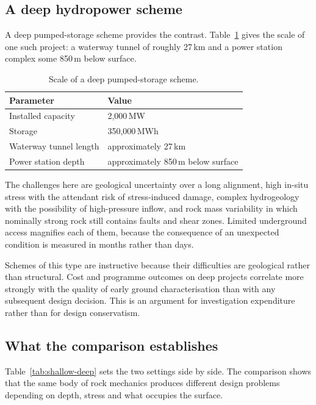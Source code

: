 \subsection{A deep hydropower scheme}
\label{sec:case-deep}

A deep pumped-storage scheme provides the contrast. Table~\ref{tab:deep-case}
gives the scale of one such project: a waterway tunnel of roughly 27\,km and a
power station complex some 850\,m below surface.

\begin{table}[htbp]
\caption{Scale of a deep pumped-storage scheme.}
\label{tab:deep-case}
\centering
\small
\begin{tabularx}{\textwidth}{X l}
\toprule
\textbf{Parameter} & \textbf{Value} \\
\midrule
Installed capacity & 2{,}000\,MW \\
Storage & 350{,}000\,MWh \\
Waterway tunnel length & approximately 27\,km \\
Power station depth & approximately 850\,m below surface \\
\bottomrule
\end{tabularx}
\end{table}

The challenges here are geological uncertainty over a long alignment, high
in-situ stress with the attendant risk of stress-induced damage, complex
hydrogeology with the possibility of high-pressure inflow, and rock mass
variability in which nominally strong rock still contains faults and shear
zones. Limited underground access magnifies each of them, because the
consequence of an unexpected condition is measured in months rather than days.

Schemes of this type are instructive because their difficulties are
geological rather than structural. Cost and programme outcomes on deep
projects correlate more strongly with the quality of early ground
characterisation than with any subsequent design decision. This is an
argument for investigation expenditure rather than for design conservatism.

\subsection{What the comparison establishes}
\label{sec:comparison}

Table~\ref{tab:shallow-deep} sets the two settings side by side. The
comparison shows that the same
body of rock mechanics produces different design problems depending
on depth, stress and what occupies the surface.

